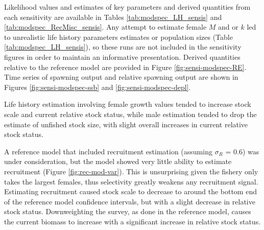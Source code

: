 \documentclass[11pt,
  english,
  a4paper,
]{article}
\begin{document}
\tagstructend


Likelihood values and estimates of key parameters and derived quantities from each sensitivity are available in Tables \ref{tab:modspec_LH_sensis} and \ref{tab:modspec_RecMisc_sensis}. Any attempt to estimate female {\(M\)\leavevmode\tagmcend\tagstructend} and or {\(k\)\leavevmode\tagmcend\tagstructend} led to unrealistic life history parameters estimates or population sizes (Table \ref{tab:modspec_LH_sensis}), so these runs are not included in the sensitivity figures in order to maintain an informative presentation. Derived quantities relative to the reference model are provided in Figure \ref{fig:sensi-modspec-RE}. Time series of spawning output and relative spawning output are shown in Figures \ref{fig:sensi-modspec-ssb} and \ref{fig:sensi-modspec-depl}.

\leavevmode\tagmcend\tagstructend\par


Life history estimation involving female growth values tended to increase stock scale and current relative stock status, while male estimation tended to drop the estimate of unfished stock size, with slight overall increases in current relative stock status.

\leavevmode\tagmcend\tagstructend\par


A reference model that included recruitment estimation (assuming {\(\sigma_R\)\leavevmode\tagmcend\tagstructend} = 0.6) was under consideration, but the model showed very little ability to estimate recruitment (Figure \ref{fig:rec-mod-var}). This is unsurprising given the fishery only takes the largest females, thus selectivity greatly weakens any recruitment signal. Estimating recruitment caused stock scale to decrease to around the bottom end of the reference model confidence intervals, but with a slight decrease in relative stock status. Downweighting the survey, as done in the reference model, causes the current biomass to increase with a significant increase in relative stock status.

\leavevmode\tagmcend\tagstructend\par
\end{document}
